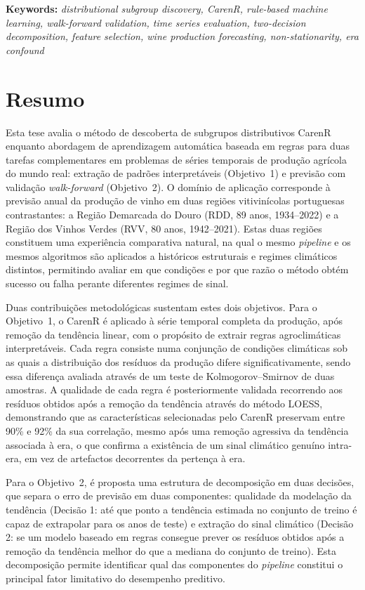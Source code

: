 \textbf{Keywords: }\textit{distributional subgroup discovery, CarenR, rule-based machine learning, walk-forward validation, time series evaluation, two-decision decomposition, feature selection, wine production forecasting, non-stationarity, era confound}

\cleardoublepage

\chapter*{Resumo}

Esta tese avalia o método de descoberta de subgrupos distributivos CarenR enquanto abordagem de aprendizagem automática baseada em regras para duas tarefas complementares em problemas de séries temporais de produção agrícola do mundo real: extração de padrões interpretáveis (Objetivo~1) e previsão com validação \textit{walk-forward} (Objetivo~2). O domínio de aplicação corresponde à previsão anual da produção de vinho em duas regiões vitivinícolas portuguesas contrastantes: a Região Demarcada do Douro (RDD, 89 anos, 1934--2022) e a Região dos Vinhos Verdes (RVV, 80 anos, 1942--2021). Estas duas regiões constituem uma experiência comparativa natural, na qual o mesmo \textit{pipeline} e os mesmos algoritmos são aplicados a históricos estruturais e regimes climáticos distintos, permitindo avaliar em que condições e por que razão o método obtém sucesso ou falha perante diferentes regimes de sinal.

Duas contribuições metodológicas sustentam estes dois objetivos. Para o Objetivo~1, o CarenR é aplicado à série temporal completa da produção, após remoção da tendência linear, com o propósito de extrair regras agroclimáticas interpretáveis. Cada regra consiste numa conjunção de condições climáticas sob as quais a distribuição dos resíduos da produção difere significativamente, sendo essa diferença avaliada através de um teste de Kolmogorov--Smirnov de duas amostras. A qualidade de cada regra é posteriormente validada recorrendo aos resíduos obtidos após a remoção da tendência através do método LOESS, demonstrando que as características selecionadas pelo CarenR preservam entre 90\% e 92\% da sua correlação, mesmo após uma remoção agressiva da tendência associada à era, o que confirma a existência de um sinal climático genuíno intra-era, em vez de artefactos decorrentes da pertença à era.

Para o Objetivo~2, é proposta uma estrutura de decomposição em duas decisões, que separa o erro de previsão em duas componentes: qualidade da modelação da tendência (Decisão 1: até que ponto a tendência estimada no conjunto de treino é capaz de extrapolar para os anos de teste) e extração do sinal climático (Decisão 2: se um modelo baseado em regras consegue prever os resíduos obtidos após a remoção da tendência melhor do que a mediana do conjunto de treino). Esta decomposição permite identificar qual das componentes do \textit{pipeline} constitui o principal fator limitativo do desempenho preditivo.

